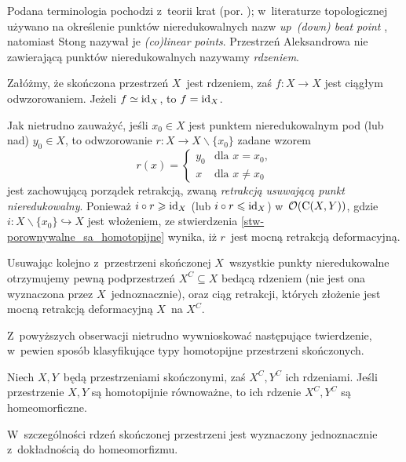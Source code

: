 Podana terminologia pochodzi z~teorii krat (por. \cite[Section 5.4]{Schroder03}); w~literaturze topologicznej używano na określenie punktów nieredukowalnych nazw \textit{up~(down) beat point} \cite{May08,Barmak07}, natomiast Stong \cite{Stong66} nazywał je \textit{(co)linear points}.
Przestrzeń Aleksandrowa nie zawierającą punktów nieredukowalnych nazywamy \textit{rdzeniem}.

\begin{stw}
Załóżmy, że skończona przestrzeń $X$~jest rdzeniem, zaś $f\colon X\to X$ jest ciągłym odwzorowaniem. Jeżeli $f\simeq \operatorname{id}_X$, to $f=\operatorname{id}_X$.
\end{stw}

Jak nietrudno zauważyć, jeśli $x_0\in X$ jest punktem nieredukowalnym pod (lub nad) $y_0\in X$, to odwzorowanie $r\colon X\to X\smallsetminus \{x_0\}$ zadane wzorem \[r(x)=\begin{cases}y_0 &\text{dla } x=x_0,\\ x &\text{dla }x\not=x_0\end{cases}\] jest zachowującą porządek retrakcją, zwaną \textit{retrakcją usuwającą punkt nieredukowalny}. Ponieważ $i\circ r\geqslant \operatorname{id}_X$ (lub $i\circ r\leqslant \operatorname{id}_X$) w~$\mathcal{O}(\operatorname{C}(X,Y))$, gdzie \mbox{$i\colon X\smallsetminus\{x_0\}\hookrightarrow X$} jest włożeniem, ze stwierdzenia \ref{stw-porownywalne_sa_homotopijne} wynika, iż $r$~jest mocną retrakcją deformacyjną. 

Usuwając kolejno z~przestrzeni skończonej $X$~wszystkie punkty nieredukowalne otrzymujemy pewną podprzestrzeń $X^C\subseteq X$ bedącą rdzeniem (nie jest ona wyznaczona przez $X$~jednoznacznie), oraz ciąg retrakcji, których złożenie jest mocną retrakcją deformacyjną $X$~na $X^C$. 

Z~powyższych obserwacji nietrudno wywnioskować następujące twierdzenie, w~pewien sposób klasyfikujące typy homotopijne przestrzeni skończonych.

\begin{tw}\label{tw-stonga}
Niech $X,Y$~będą przestrzeniami skończonymi, zaś $X^C, Y^C$ ich rdzeniami. Jeśli przestrzenie $X,Y$ są homotopijnie równoważne, to ich rdzenie $X^C,Y^C$ są homeomorficzne.
\end{tw}

W~szczególności rdzeń skończonej przestrzeni jest wyznaczony jednoznacznie z~dokładnością do homeomorfizmu.

